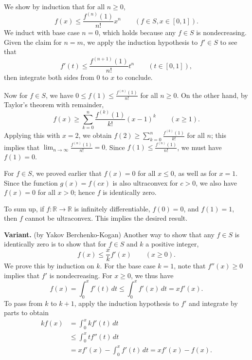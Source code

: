 \documentclass[amssymb,twocolumn,pra,10pt,aps]{revtex4-1}
\begin{document}
\begin{itemize}
We show by induction that for all $n \geq 0$,
\[
f(x) \leq \frac{f^{(n)}(1)}{n!} x^n \qquad (f \in S, x \in [0,1]).
\]
We induct with base case $n=0$, which holds because any $f \in S$ is nondecreasing. Given the claim for $n=m$,
we apply the induction hypothesis to $f' \in S$ to see that
\[
f'(t) \leq \frac{f^{(n+1)}(1)}{n!} t^n \qquad (t \in [0,1]),
\]
then integrate both sides from $0$ to $x$ to conclude.

Now for $f \in S$, we have $0 \leq f(1) \leq \frac{f^{(n)}(1)}{n!}$ for all $n \geq 0$. 
On the other hand, by Taylor's theorem with remainder,
\[
f(x) \geq \sum_{k=0}^n \frac{f^{(k)}(1)}{k!}(x-1)^k \qquad (x \geq 1).
\]
Applying this with $x=2$, we obtain $f(2) \geq \sum_{k=0}^n \frac{f^{(k)}(1)}{k!}$ for all $n$;
this implies that $\lim_{n\to\infty}  \frac{f^{(n)}(1)}{n!} = 0$.
Since $f(1) \leq \frac{f^{(n)}(1)}{n!}$, we must have $f(1) = 0$.

For $f \in S$, we proved earlier that $f(x) = 0$ for all $x\leq 0$, as well as for $x=1$. Since
the function $g(x) = f(cx)$ is also ultraconvex for $c>0$, we also have $f(x) = 0$ for all $x>0$;
hence $f$ is identically zero.

To sum up, if $f\colon \mathbb{R} \to \mathbb{R}$ is infinitely differentiable, $f(0)=0$, and $f(1) = 1$,
then $f$ cannot be ultraconvex. This implies the desired result.

\noindent
\textbf{Variant.}
(by Yakov Berchenko-Kogan)
Another way to show that any $f \in S$ is identically zero is to show that for $f \in S$ and $k$ a positive integer,
\[
f(x) \leq \frac{x}{k} f'(x) \qquad (x \geq 0).
\]
We prove this by induction on $k$.
For the base case $k=1$, note that $f''(x) \geq 0$ implies that $f'$ is nondecreasing. For $x \geq 0$, we thus have
\[
f(x) = \int_0^x f'(t)\,dt \leq \int_0^x f'(x)\,dt = x f'(x).
\]
To pass from $k$ to $k+1$, apply the induction hypothesis to $f'$ and integrate by parts to obtain
\begin{align*}
kf(x) &= \int_0^x k f'(t)\,dt \\
&\leq \int_0^x t f''(t)\,dt \\
&= xf'(x) - \int_0^x f'(t)\,dt = xf'(x) - f(x).
\end{align*}




\end{itemize}
\end{document}
